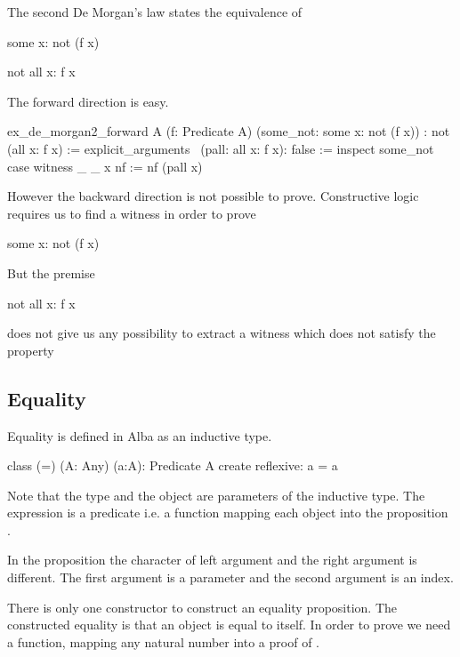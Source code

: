 The second De Morgan's law states the equivalence of
\begin{alba}
  some x: not (f x)

  not all x: f x
\end{alba}

The forward direction is easy.

\begin{alba}
  ex_de_morgan2_forward
    A (f: Predicate A)
    (some_not: some x: not (f x))
    : not (all x: f x) :=
     explicit_arguments
       \ (pall: all x: f x): false :=
         inspect some_not case
           witness _ _ x nf :=
             nf (pall x)
\end{alba}

However the backward direction is not possible to prove. Constructive logic
requires us to find a witness in order to prove
\begin{alba}
  some x: not (f x)
\end{alba}
%
But the premise
%
\begin{alba}
  not all x: f x
\end{alba}
does not give us any possibility to extract a witness which does not satisfy
the property 



\subsection{Equality}

Equality is defined in Alba as an inductive type.
\begin{alba}
   class
     (=) (A: Any) (a:A): Predicate A
   create
     reflexive: a = a
\end{alba}

Note that the type  and the object  are parameters of the
inductive type. The expression  is a predicate i.e. a function
 mapping each object  into the
proposition .

In the proposition  the character of left argument  and
the right argument  is different. The first argument is a parameter
and the second argument is an index.

There is only one constructor to construct an equality proposition. The
constructed equality is that an object is equal to itself. In order to prove
 we need a function, mapping any natural
number  into a proof of .

